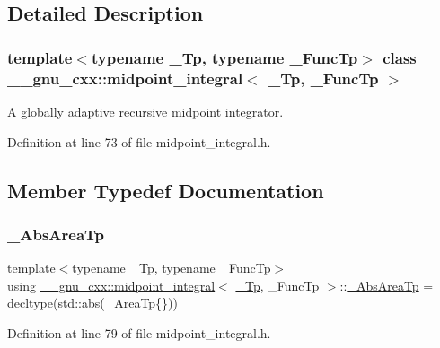 \subsection{Detailed Description}
\subsubsection*{template$<$typename \+\_\+\+Tp, typename \+\_\+\+Func\+Tp$>$\newline
class \+\_\+\+\_\+gnu\+\_\+cxx\+::midpoint\+\_\+integral$<$ \+\_\+\+Tp, \+\_\+\+Func\+Tp $>$}

A globally adaptive recursive midpoint integrator. 

Definition at line 73 of file midpoint\+\_\+integral.\+h.



\subsection{Member Typedef Documentation}
\mbox{\label{class____gnu__cxx_1_1midpoint__integral_ae4c2b0cff4d7385e5c046ec4400bc69e}} 
\subsubsection{\texorpdfstring{\+\_\+\+Abs\+Area\+Tp}{\_AbsAreaTp}}
{\footnotesize\ttfamily template$<$typename \+\_\+\+Tp, typename \+\_\+\+Func\+Tp$>$ \\
using \hyperlink{class____gnu__cxx_1_1midpoint__integral}{\+\_\+\+\_\+gnu\+\_\+cxx\+::midpoint\+\_\+integral}$<$ \hyperlink{namespace____gnu__cxx_a3b19a9c800ca194374ef9172290f7d79}{\+\_\+\+Tp}, \+\_\+\+Func\+Tp $>$\+::\hyperlink{class____gnu__cxx_1_1midpoint__integral_ae4c2b0cff4d7385e5c046ec4400bc69e}{\+\_\+\+Abs\+Area\+Tp} =  decltype(std\+::abs(\hyperlink{class____gnu__cxx_1_1midpoint__integral_a43cd31237c2257dd657a2a84fd33dd69}{\+\_\+\+Area\+Tp}\{\}))}



Definition at line 79 of file midpoint\+\_\+integral.\+h.

\mbox{\label{class____gnu__cxx_1_1midpoint__integral_a43cd31237c2257dd657a2a84fd33dd69}} 

